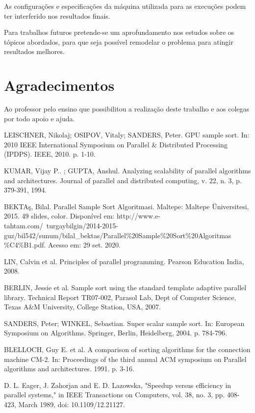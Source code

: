 \documentclass[journal]{IEEEtran}
\begin{document}
As configurações e especificações da máquina utilizada para as execuções podem ter interferido nos resultados finais.


Para trabalhos futuros pretende-se um aprofundamento nos estudos sobre os tópicos abordados, para que seja possível remodelar o problema para atingir resultados melhores. 


\section*{Agradecimentos}
Ao professor pelo ensino que possibilitou a realização deste trabalho e aos colegas por todo apoio e ajuda.



\ifCLASSOPTIONcaptionsoff
  \newpage
\fi


\begin{thebibliography}{1}


LEISCHNER, Nikolaj; OSIPOV, Vitaly; SANDERS, Peter. GPU sample sort. In: 2010 IEEE International Symposium on Parallel \& Distributed Processing (IPDPS). IEEE, 2010. p. 1-10.
  
  KUMAR, Vijay P.. ; GUPTA, Anshul. Analyzing scalability of parallel algorithms and architectures. Journal of parallel and distributed computing, v. 22, n. 3, p. 379-391, 1994.
 
  BEKTAş, Bilal. Parallel Sample Sort Algoritmasi. Maltepe: Maltepe Üniversitesi, 2015. 49 slides, color. Disponível em: http://www.e-tahtam.com/~turgaybilgin/2014-2015-guz/bil542/sunum/bilal\_bektas/Parallel\%20Sample\%20Sort\%20Algoritmas\\\%C4\%B1.pdf. Acesso em: 29 set. 2020.
 
 LIN, Calvin et al. Principles of parallel programming. Pearson Education India, 2008.
 
 BERLIN, Jessie et al. Sample sort using the standard template adaptive parallel library. Technical Report TR07-002, Parasol Lab, Dept of Computer Science, Texas A\&M University, College Station, USA, 2007.
 
 SANDERS, Peter; WINKEL, Sebastian. Super scalar sample sort. In: European Symposium on Algorithms. Springer, Berlin, Heidelberg, 2004. p. 784-796.

BLELLOCH, Guy E. et al. A comparison of sorting algorithms for the connection machine CM-2. In: Proceedings of the third annual ACM symposium on Parallel algorithms and architectures. 1991. p. 3-16.

D. L. Eager, J. Zahorjan and E. D. Lazowska, "Speedup versus efficiency in parallel systems," in IEEE Transactions on Computers, vol. 38, no. 3, pp. 408-423, March 1989, doi: 10.1109/12.21127.

\end{thebibliography}
\end{document}
